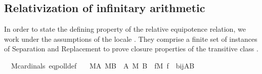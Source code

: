 \subsection{Relativization of infinitary arithmetic\label{sec:relative-arith}%
}
In order to state the defining property of the relative
equipotence relation, we work under the assumptions of the
locale . They comprise a finite set
of instances of Separation and Replacement to prove
closure properties of the transitive class .%
\begin{isabelle}
\isamarkupfalse%
\ {\isacharparenleft}{\kern0pt}\ M{\isacharunderscore}{\kern0pt}cardinals{\isacharparenright}{\kern0pt}\ eqpoll{\isacharunderscore}{\kern0pt}def{\isacharprime}{\kern0pt}{\isacharcolon}{\kern0pt}\isanewline
\ \ \ {\isachardoublequoteopen}M{\isacharparenleft}{\kern0pt}A{\isacharparenright}{\kern0pt}{\isachardoublequoteclose}\ {\isachardoublequoteopen}M{\isacharparenleft}{\kern0pt}B{\isacharparenright}{\kern0pt}{\isachardoublequoteclose}\ \ {\isachardoublequoteopen}A\ {\isasymapprox}\isactrlbsup M\isactrlesup \ B\ {\isasymlongleftrightarrow}\ {\isacharparenleft}{\kern0pt}{\isasymexists}f{\isacharbrackleft}{\kern0pt}M{\isacharbrackright}{\kern0pt}{\isachardot}{\kern0pt}\ f\ {\isasymin}\ bij{\isacharparenleft}{\kern0pt}A{\isacharcomma}{\kern0pt}B{\isacharparenright}{\kern0pt}{\isacharparenright}{\kern0pt}{\isachardoublequoteclose}
\end{isabelle}

